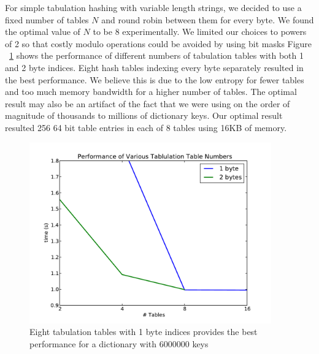 \documentclass[11pt]{article}
\begin{document}
For simple tabulation hashing with variable length strings, we decided to use a
fixed number of tables $N$ and round robin between them for every byte.  We
found the optimal value of $N$ to be 8 experimentally.  We limited our choices
to powers of 2 so that costly modulo operations could be avoided by using bit
masks Figure ~\ref{fig:tables} shows the performance of different numbers of
tabulation tables with both 1 and 2 byte indices.  Eight hash tables indexing
every byte separately resulted in the best performance.    We believe this is due
to the low entropy for fewer tables and too much memory bandwidth for a higher
number of tables.  The optimal result may also be an artifact of the fact that
we were using on the order of magnitude of thousands to millions of dictionary
keys.  Our optimal result resulted 256 64
bit table entries in each of 8 tables using 16KB of memory.
 \begin{figure}[H]
   \centering
   \includegraphics[width=4.1in]{tables.pdf}
   \caption{Eight tabulation tables with 1 byte indices provides the best performance for a
   dictionary with 6000000 keys}
   \label{fig:tables}
 \end{figure}
       
\end{document}
